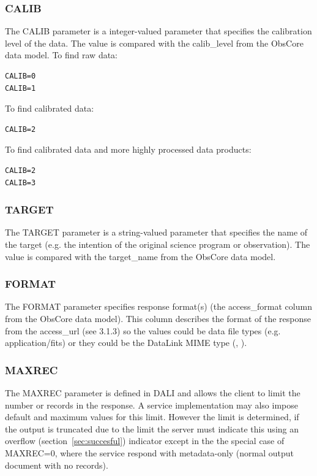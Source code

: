 \documentclass[11pt,a4paper]{ivoa}
\begin{document}
\subsubsection{CALIB}
The CALIB parameter is a integer-valued parameter that specifies the calibration level of the data. The value is compared with the calib\_level from the ObsCore data model. To find raw data:

\begin{lstlisting}
CALIB=0
CALIB=1
\end{lstlisting}
To find calibrated data:

\begin{lstlisting}
CALIB=2
\end{lstlisting}
To find calibrated data and more highly processed data products:

\begin{lstlisting}
CALIB=2
CALIB=3
\end{lstlisting}

\subsubsection{TARGET}
The TARGET parameter is a string-valued parameter that specifies the name of the target (e.g. the intention of the original science program or observation). The value is compared with the target\_name from the ObsCore data model.

\subsubsection{FORMAT}
The FORMAT parameter specifies response format(s)  (the access\_format column from the ObsCore data model). This column describes the format of the response from the access\_url (see 3.1.3) so the values could be data file types (e.g. application/fits) or they could be the DataLink  MIME type (\cite{std:DataLink}, \cite{std:TSV}).  

\subsubsection{MAXREC}
The MAXREC parameter is defined in DALI and allows the client to limit the number or records in the response. A service implementation may also impose default and maximum values for this limit. However the limit is determined, if the output is truncated due to the limit the server must indicate this using an overflow  (section~\ref{sec:succesful}) indicator except in the the special case of MAXREC=0, where the  service respond with metadata-only (normal output document with no records).
\end{document}
